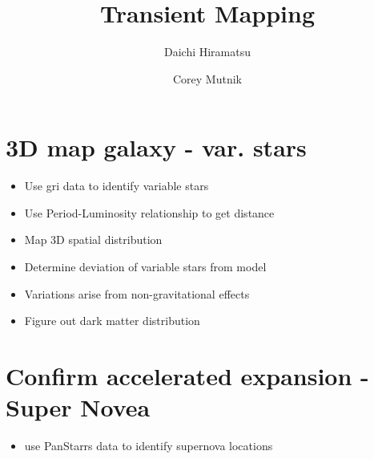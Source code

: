 \documentclass[aps,prl,twocolumn,superscriptaddress]{revtex4-1}
\begin{document}
\title{Transient Mapping}


\author{Daichi Hiramatsu}
\author{Corey Mutnik}



\begin{abstract}

\end{abstract}

\maketitle    


\section{}


\section{3D map galaxy - var. stars}

\begin{itemize}
	\item{} Use gri data to identify variable stars
	\item{} Use Period-Luminosity relationship to get distance
	\item{} Map 3D spatial distribution
	\item{} Determine deviation of variable stars from model
	\item{} Variations arise from non-gravitational effects
	\item{} Figure out dark matter distribution
\end{itemize}

\section{Confirm accelerated expansion - Super Novea}
\begin{itemize}
	\item{} use PanStarrs data to identify supernova locations
\end{itemize}
\end{document}

